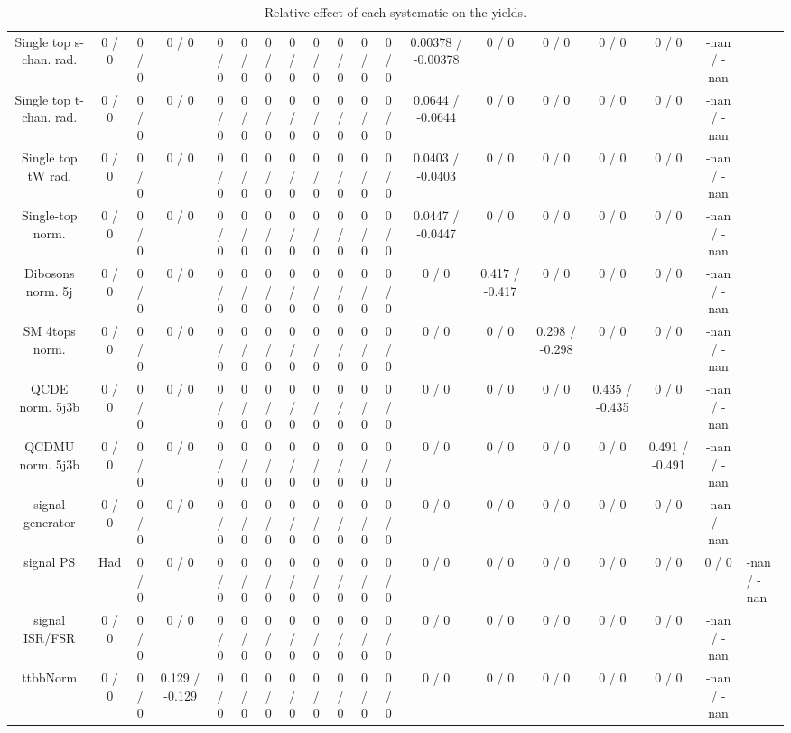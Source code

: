 \documentclass[10pt]{article}
\begin{document}
\begin{table}[htbp]
\begin{center}
\begin{tabular}{|c|c|c|c|c|c|c|c|c|c|c|c|c|c|c|c|c|c|}
  Single top s-chan. rad. & 0 / 0 & 0 / 0 & 0 / 0 & 0 / 0 & 0 / 0 & 0 / 0 & 0 / 0 & 0 / 0 & 0 / 0 & 0 / 0 & 0 / 0 & 0.00378 / -0.00378 & 0 / 0 & 0 / 0 & 0 / 0 & 0 / 0 & -nan / -nan \\ 
  Single top t-chan. rad. & 0 / 0 & 0 / 0 & 0 / 0 & 0 / 0 & 0 / 0 & 0 / 0 & 0 / 0 & 0 / 0 & 0 / 0 & 0 / 0 & 0 / 0 & 0.0644 / -0.0644 & 0 / 0 & 0 / 0 & 0 / 0 & 0 / 0 & -nan / -nan \\ 
  Single top tW rad. & 0 / 0 & 0 / 0 & 0 / 0 & 0 / 0 & 0 / 0 & 0 / 0 & 0 / 0 & 0 / 0 & 0 / 0 & 0 / 0 & 0 / 0 & 0.0403 / -0.0403 & 0 / 0 & 0 / 0 & 0 / 0 & 0 / 0 & -nan / -nan \\ 
  Single-top norm. & 0 / 0 & 0 / 0 & 0 / 0 & 0 / 0 & 0 / 0 & 0 / 0 & 0 / 0 & 0 / 0 & 0 / 0 & 0 / 0 & 0 / 0 & 0.0447 / -0.0447 & 0 / 0 & 0 / 0 & 0 / 0 & 0 / 0 & -nan / -nan \\ 
  Dibosons norm. 5j & 0 / 0 & 0 / 0 & 0 / 0 & 0 / 0 & 0 / 0 & 0 / 0 & 0 / 0 & 0 / 0 & 0 / 0 & 0 / 0 & 0 / 0 & 0 / 0 & 0.417 / -0.417 & 0 / 0 & 0 / 0 & 0 / 0 & -nan / -nan \\ 
  SM 4tops norm. & 0 / 0 & 0 / 0 & 0 / 0 & 0 / 0 & 0 / 0 & 0 / 0 & 0 / 0 & 0 / 0 & 0 / 0 & 0 / 0 & 0 / 0 & 0 / 0 & 0 / 0 & 0.298 / -0.298 & 0 / 0 & 0 / 0 & -nan / -nan \\ 
  QCDE norm. 5j3b & 0 / 0 & 0 / 0 & 0 / 0 & 0 / 0 & 0 / 0 & 0 / 0 & 0 / 0 & 0 / 0 & 0 / 0 & 0 / 0 & 0 / 0 & 0 / 0 & 0 / 0 & 0 / 0 & 0.435 / -0.435 & 0 / 0 & -nan / -nan \\ 
  QCDMU norm. 5j3b & 0 / 0 & 0 / 0 & 0 / 0 & 0 / 0 & 0 / 0 & 0 / 0 & 0 / 0 & 0 / 0 & 0 / 0 & 0 / 0 & 0 / 0 & 0 / 0 & 0 / 0 & 0 / 0 & 0 / 0 & 0.491 / -0.491 & -nan / -nan \\ 
  signal generator & 0 / 0 & 0 / 0 & 0 / 0 & 0 / 0 & 0 / 0 & 0 / 0 & 0 / 0 & 0 / 0 & 0 / 0 & 0 / 0 & 0 / 0 & 0 / 0 & 0 / 0 & 0 / 0 & 0 / 0 & 0 / 0 & -nan / -nan \\ 
  signal PS & Had & 0 / 0 & 0 / 0 & 0 / 0 & 0 / 0 & 0 / 0 & 0 / 0 & 0 / 0 & 0 / 0 & 0 / 0 & 0 / 0 & 0 / 0 & 0 / 0 & 0 / 0 & 0 / 0 & 0 / 0 & 0 / 0 & -nan / -nan \\ 
  signal ISR/FSR & 0 / 0 & 0 / 0 & 0 / 0 & 0 / 0 & 0 / 0 & 0 / 0 & 0 / 0 & 0 / 0 & 0 / 0 & 0 / 0 & 0 / 0 & 0 / 0 & 0 / 0 & 0 / 0 & 0 / 0 & 0 / 0 & -nan / -nan \\ 
 ttbbNorm & 0 / 0 & 0 / 0 & 0.129 / -0.129 & 0 / 0 & 0 / 0 & 0 / 0 & 0 / 0 & 0 / 0 & 0 / 0 & 0 / 0 & 0 / 0 & 0 / 0 & 0 / 0 & 0 / 0 & 0 / 0 & 0 / 0 & -nan / -nan \\ 
\hline 
\end{tabular} 
\caption{Relative effect of each systematic on the yields.} 
\end{center} 
\end{table} 
\end{document}
